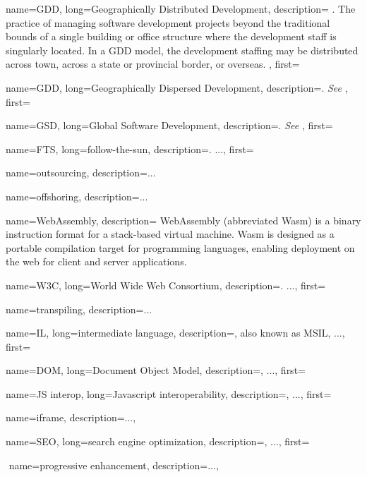 {
    name=GDD, 
    long={Geographically Distributed Development},
    description={
        . The practice of managing software development projects
        beyond the traditional bounds of a single building or office structure where
        the development staff is singularly located. In a GDD model, the development
        staffing may be distributed across town, across a state or provincial
        border, or overseas. \autocite{Yuhong_2008}
    }, 
    first=
    }

{
    name=GDD,
    long={Geographically Dispersed Development},
    description={. \textit{See} },
    first=
}

{
    name=GSD,
    long={Global Software Development},
    description={. \textit{See} },
    first=
}

{
    name=FTS,
    long={follow-the-sun},
    description={. ...}, %
    first=
}

{
    name=outsourcing, 
    description={...} %
}


{
    name=offshoring, 
    description={...} %
}


{
    name=WebAssembly, 
    description={
        WebAssembly (abbreviated Wasm) is a binary instruction format for a
        stack-based virtual machine. Wasm is designed as a portable compilation
        target for programming languages, enabling deployment on the web for client
        and server applications.\autocite{Webassembly_2021}
    }
}

{
    name=W3C,
    long={World Wide Web Consortium},
    description={. ...},%
    first=
}

{
    name=transpiling, 
    description={...} %
}

{
    name=IL,
    long={intermediate language},
    description={, also known as MSIL, ...},%
    first=
}

{
    name=DOM,
    long={Document Object Model},
    description={, ...},%
    first=
}

{
    name=JS interop,
    long={Javascript interoperability},
    description={, ...},%
    first=
}

{
    name=iframe,
    description={...},%
}

{
    name=SEO,
    long={search engine optimization},
    description={, ...},%
    first=
}

‌
{
    name={progressive enhancement},
    description={...},%
}
